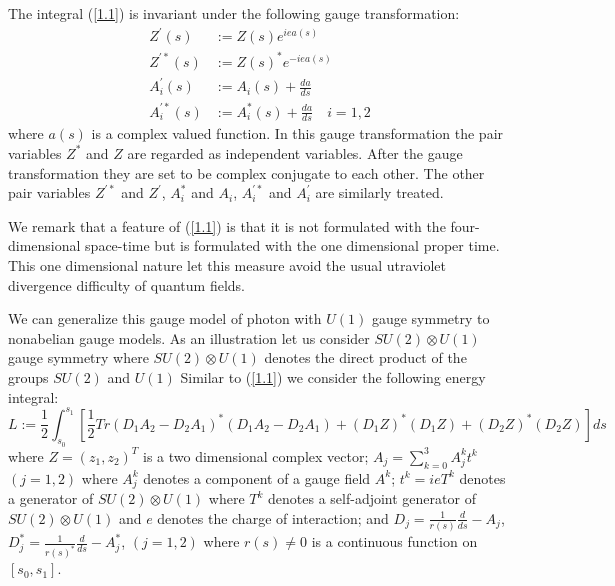 \documentclass[a4paper,a4paper]{article}
\begin{document}
The integral (\ref{1.1}) is invariant under the following gauge transformation:
\begin{equation}
\begin{array}{rl}
Z^{\prime}(s) & := Z(s)e^{iea(s)} \\
Z^{\prime *}(s)  & := Z(s)^{*}e^{-iea(s)}\\
A_i^{'}(s) & := A_i(s)+\frac{da}{ds}\\
A_i^{'*}(s) & := A^{*}_i(s)+\frac{da}{ds}
\quad i=1,2
\end{array}
\label{1.2}
\end{equation}
where $a(s)$ is a complex valued function. In this gauge transformation the pair variables $Z^{*}$ and $Z$ are regarded as independent variables. After the gauge transformation they are set to be complex conjugate to each other.
The other pair variables $Z^{\prime *}$ and $Z^{\prime}$, $A_i^{*}$ and $A_i$, $A_i^{'*}$ and $ A_i^{'}$ are similarly treated.

We remark that a  feature of (\ref{1.1}) is that it is not formulated with the four-dimensional space-time but is formulated with the one dimensional proper time. This one dimensional nature let this measure avoid the usual utraviolet divergence difficulty of quantum fields. 

We can generalize this gauge model of photon with $U(1)$ gauge symmetry
to nonabelian gauge models.
As an illustration let us consider $SU(2)\otimes U(1)$ gauge symmetry where 
$SU(2)\otimes U(1)$ denotes the  direct product of the groups $SU(2)$ and $U(1)$ 
Similar to 
(\ref{1.1}) we consider the following energy integral:
\begin{equation}
L := \frac12\int_{s_0}^{s_1}
[\frac12 Tr (D_1A_2-D_2A_1)^{*}(D_1A_2-D_2A_1) +
(D_1Z)^{*}(D_1Z)+(D_2Z)^{*}(D_2Z)]ds
\label{n1}
\end{equation}
where 
$Z= (z_1, z_2)^{T}$ is a two dimensional complex vector;
$A_j =\sum_{k=0}^{3}A_j^k t^k $ $(j=1,2)$ where
$A_j^k$ denotes a component of a gauge field $A^k$;
$t^k=ieT^k$ denotes a generator of $SU(2)\otimes U(1)$ where $T^k$ denotes
a self-adjoint generator of $SU(2)\otimes U(1)$ and $e$ denotes the charge of interaction; and
$D_j=\frac{1}{r(s)}\frac{d}{ds}-A_j$, 
 $D_j^*=\frac{1}{r(s)^{*}}\frac{d}{ds}-A_j^*$, $(j=1,2)$
where $r(s)\neq 0$ is a continuous function on $[s_0,s_1]$.
\end{document}
